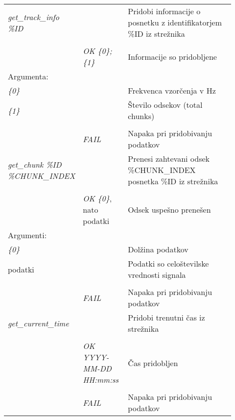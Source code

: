 \documentclass[12pt,a4paper,twoside,openright,slovene]{book}
\begin{document}
\begin{footnotesize}
\begin{center}
\begin{longtable}{p{0.22\linewidth}|p{0.2\linewidth}|p{0.5\linewidth}}
			\textit{get\_track\_info \%ID} &  & Pridobi informacije o posnetku z identifikatorjem \%ID iz strežnika \\ \\
			& \textit{OK \{0\};\{1\}} & Informacije so pridobljene \\
			\multicolumn{3}{l}{\quad Argumenta:} \\
			\multicolumn{2}{l|}{\quad\quad \textit{\{0\}}} & Frekvenca vzorčenja v Hz \\
			\multicolumn{2}{l|}{\quad\quad \textit{\{1\}}} & Število odsekov (total chunks) \\ \\
			& \textit{FAIL} & Napaka pri pridobivanju podatkov \\ \hline
			
			\textit{get\_chunk \%ID \%CHUNK\_INDEX} &  & Prenesi zahtevani odsek \%CHUNK\_INDEX posnetka \%ID iz strežnika \\ \\
			& \textit{OK \{0\}}, nato podatki & Odsek uspešno prenešen \\
			\multicolumn{3}{l}{\quad Argumenti:} \\
			\multicolumn{2}{l|}{\quad\quad \textit{\{0\}}} & Dolžina podatkov \\
			\multicolumn{2}{l|}{\quad\quad podatki} & Podatki so celoštevilske vrednosti signala \\ \\
			& \textit{FAIL} & Napaka pri pridobivanju podatkov \\ \hline
			
			\textit{get\_current\_time} &  & Pridobi trenutni čas iz strežnika \\ \\
			& \textit{OK YYYY-MM-DD HH:mm:ss} & Čas pridobljen \\ \\
			& \textit{FAIL} & Napaka pri pridobivanju podatkov \\ \hline
		\end{longtable}
	\end{center}
\end{footnotesize}
\end{document}
